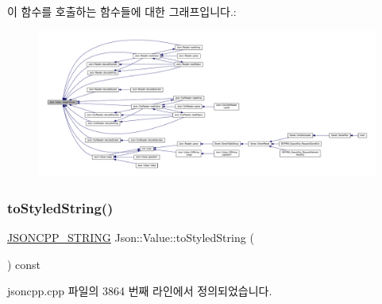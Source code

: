 이 함수를 호출하는 함수들에 대한 그래프입니다.\+:\nopagebreak
\begin{figure}[H]
\begin{center}
\leavevmode
\includegraphics[width=350pt]{class_json_1_1_value_a5263476047f20e2fc6de470e4de34fe5_icgraph}
\end{center}
\end{figure}
\mbox{\label{class_json_1_1_value_a00154cc8662d7a845ed59e175c2496cb}} 
\subsubsection{\texorpdfstring{to\+Styled\+String()}{toStyledString()}}
{\footnotesize\ttfamily \hyperlink{json_8h_a1e723f95759de062585bc4a8fd3fa4be}{J\+S\+O\+N\+C\+P\+P\+\_\+\+S\+T\+R\+I\+NG} Json\+::\+Value\+::to\+Styled\+String (\begin{DoxyParamCaption}{ }\end{DoxyParamCaption}) const}



jsoncpp.\+cpp 파일의 3864 번째 라인에서 정의되었습니다.


